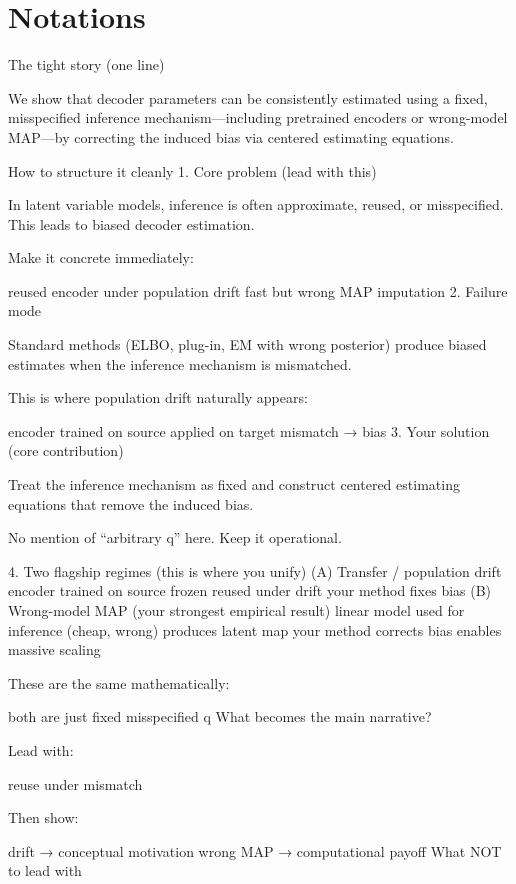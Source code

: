 \documentclass[twoside,11pt]{article}
\begin{document}
\listoftodos
\newpage

\section{Notations}

\newpage


The tight story (one line)

We show that decoder parameters can be consistently estimated using a fixed, misspecified inference mechanism—including pretrained encoders or wrong-model MAP—by correcting the induced bias via centered estimating equations.

How to structure it cleanly
1. Core problem (lead with this)

In latent variable models, inference is often approximate, reused, or misspecified. This leads to biased decoder estimation.

Make it concrete immediately:

reused encoder under population drift
fast but wrong MAP imputation
2. Failure mode

Standard methods (ELBO, plug-in, EM with wrong posterior) produce biased estimates when the inference mechanism is mismatched.

This is where population drift naturally appears:

encoder trained on source
applied on target
mismatch → bias
3. Your solution (core contribution)

Treat the inference mechanism as fixed and construct centered estimating equations that remove the induced bias.

No mention of “arbitrary q” here. Keep it operational.

4. Two flagship regimes (this is where you unify)
(A) Transfer / population drift
encoder trained on source
frozen
reused under drift
your method fixes bias
(B) Wrong-model MAP (your strongest empirical result)
linear model used for inference (cheap, wrong)
produces latent map
your method corrects bias
enables massive scaling

These are the same mathematically:

both are just fixed misspecified q
What becomes the main narrative?

Lead with:

reuse under mismatch

Then show:

drift → conceptual motivation
wrong MAP → computational payoff
What NOT to lead with
\end{document}
